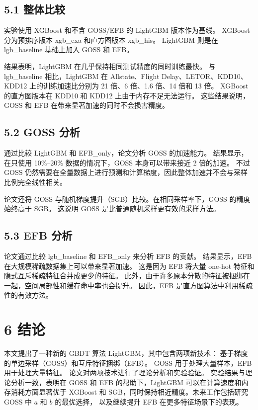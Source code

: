 \subsection{5.1 整体比较}

实验使用 XGBoost 和不含 GOSS/EFB 的 LightGBM 版本作为基线。
XGBoost 分为预排序版本 xgb\_exa 和直方图版本 xgb\_his。
LightGBM 则是在 lgb\_baseline 基础上加入 GOSS 和 EFB。

结果表明，LightGBM 在几乎保持相同测试精度的同时训练最快。
与 lgb\_baseline 相比，LightGBM 在 Allstate、Flight Delay、LETOR、KDD10、KDD12
上的训练加速比分别为 21 倍、6 倍、1.6 倍、14 倍和 13 倍。
XGBoost 的直方图版本在 KDD10 和 KDD12 上由于内存不足无法运行。
这些结果说明，GOSS 和 EFB 在带来显著加速的同时不会损害精度。

\subsection{5.2 GOSS 分析}

通过比较 LightGBM 和 EFB\_only，论文分析 GOSS 的加速能力。
结果显示，在只使用 10\%--20\% 数据的情况下，GOSS 本身可以带来接近 2 倍的加速。
不过 GOSS 仍然需要在全量数据上进行预测和计算梯度，因此整体加速并不会与采样比例完全线性相关。

论文还将 GOSS 与随机梯度提升（SGB）比较。在相同采样率下，GOSS 的精度始终高于 SGB。
这说明 GOSS 是比普通随机采样更有效的采样方法。

\subsection{5.3 EFB 分析}

论文通过比较 lgb\_baseline 和 EFB\_only 来分析 EFB 的贡献。
结果显示，EFB 在大规模稀疏数据集上可以带来显著加速。
这是因为 EFB 将大量 one-hot 特征和隐式互斥稀疏特征合并成更少的特征。
此外，由于许多原本分散的特征被捆绑在一起，空间局部性和缓存命中率也会提升。
因此，EFB 是直方图算法中利用稀疏性的有效方法。

\section{6 结论}

本文提出了一种新的 GBDT 算法 LightGBM，其中包含两项新技术：
基于梯度的单边采样（GOSS）和互斥特征捆绑（EFB）。
GOSS 用于处理大量样本，EFB 用于处理大量特征。
论文对两项技术进行了理论分析和实验验证。
实验结果与理论分析一致，表明在 GOSS 和 EFB 的帮助下，LightGBM 可以在计算速度和内存消耗方面显著优于
XGBoost 和 SGB，同时保持相近精度。未来工作包括研究 GOSS 中 $a$ 和 $b$ 的最优选择，
以及继续提升 EFB 在更多特征场景下的表现。
